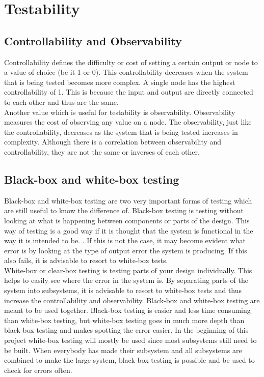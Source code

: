 \section{Testability}
\subsection{Controllability and Observability}
Controllability defines the difficulty or cost of setting a certain output or node to a value of choice (be it 1 or 0)\cite{CandO}. This controllability decreases when the system that is being tested becomes more complex. A single node has the highest controllability of 1. This is because the input and output are directly connected to each other and thus are the same. \\
Another value which is useful for testability is observability. Observability measures the cost of observing any value on a node\cite{CandO}. The observability, just like the controllability, decreases as the system that is being tested increases in complexity. Although there is a correlation between observability and controllability, they are not the same or inverses of each other.

\subsection{Black-box and white-box testing}
Black-box and white-box testing are two very important forms of testing which are still useful to know the difference of. Black-box testing is testing without looking at what is happening between components or parts of the design. This way of testing is a good way if it is thought that the system is functional in the way it is intended to be. \cite{informationvisualization}. If this is not the case, it may become evident what error is by looking at the type of output error the system is producing. If this also fails,  it is advisable to resort to white-box tests.\\
White-box or clear-box testing is testing parts of your design individually. This helps to easily see where the error in the system is. By separating parts of the system into subsystems,  it is advisable to resort to white-box tests and thus increase the controllability and observability. 
Black-box and white-box testing are meant to be used together\cite{informationvisualization}. Black-box testing is easier and less time consuming than white-box testing, but white-box testing goes in much more depth than black-box testing and makes spotting the error easier. In the beginning of this project white-box testing will mostly be used since most subsystems still need to be built. When everybody has made their subsystem and all subsystems are combined to make the large system, black-box testing is possible and be used to check for errors often.